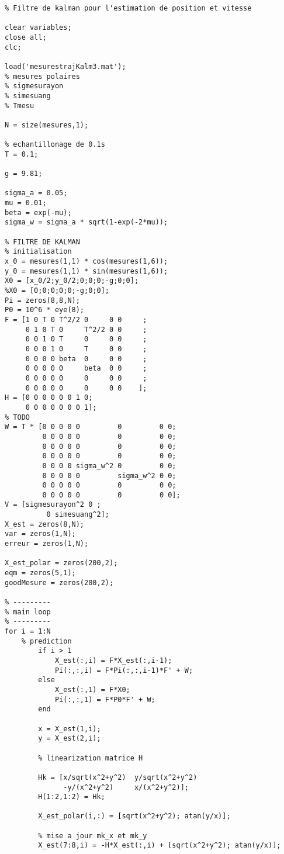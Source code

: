 
    \begin{verbatim}
% Filtre de kalman pour l'estimation de position et vitesse

clear variables;
close all;
clc;

load('mesurestrajKalm3.mat');
% mesures polaires
% sigmesurayon
% simesuang
% Tmesu

N = size(mesures,1);

% echantillonage de 0.1s
T = 0.1;

g = 9.81;

sigma_a = 0.05;
mu = 0.01;
beta = exp(-mu);
sigma_w = sigma_a * sqrt(1-exp(-2*mu));

% FILTRE DE KALMAN
% initialisation
x_0 = mesures(1,1) * cos(mesures(1,6));
y_0 = mesures(1,1) * sin(mesures(1,6));
X0 = [x_0/2;y_0/2;0;0;0;-g;0;0];
%X0 = [0;0;0;0;0;-g;0;0];
Pi = zeros(8,8,N);
P0 = 10^6 * eye(8);
F = [1 0 T 0 T^2/2 0     0 0     ;
     0 1 0 T 0     T^2/2 0 0     ;
     0 0 1 0 T     0     0 0     ;
     0 0 0 1 0     T     0 0     ;
     0 0 0 0 beta  0     0 0     ;
     0 0 0 0 0     beta  0 0     ;
     0 0 0 0 0     0     0 0     ;
     0 0 0 0 0     0     0 0    ];
H = [0 0 0 0 0 0 1 0;
     0 0 0 0 0 0 0 1];
% TODO
W = T * [0 0 0 0 0         0         0 0;
         0 0 0 0 0         0         0 0;
         0 0 0 0 0         0         0 0;
         0 0 0 0 0         0         0 0;
         0 0 0 0 sigma_w^2 0         0 0;
         0 0 0 0 0         sigma_w^2 0 0;
         0 0 0 0 0         0         0 0;
         0 0 0 0 0         0         0 0];
V = [sigmesurayon^2 0 ;
          0 simesuang^2];
X_est = zeros(8,N);
var = zeros(1,N);
erreur = zeros(1,N);

X_est_polar = zeros(200,2);
eqm = zeros(5,1);
goodMesure = zeros(200,2);

% ---------
% main loop
% ---------
for i = 1:N
    % prediction
        if i > 1
            X_est(:,i) = F*X_est(:,i-1);
            Pi(:,:,i) = F*Pi(:,:,i-1)*F' + W;
        else
            X_est(:,1) = F*X0;
            Pi(:,:,1) = F*P0*F' + W;
        end

        x = X_est(1,i);
        y = X_est(2,i);

        % linearization matrice H

        Hk = [x/sqrt(x^2+y^2)  y/sqrt(x^2+y^2)
              -y/(x^2+y^2)     x/(x^2+y^2)];
        H(1:2,1:2) = Hk;

        X_est_polar(i,:) = [sqrt(x^2+y^2); atan(y/x)];

        % mise a jour mk_x et mk_y
        X_est(7:8,i) = -H*X_est(:,i) + [sqrt(x^2+y^2); atan(y/x)];


\end{verbatim}
